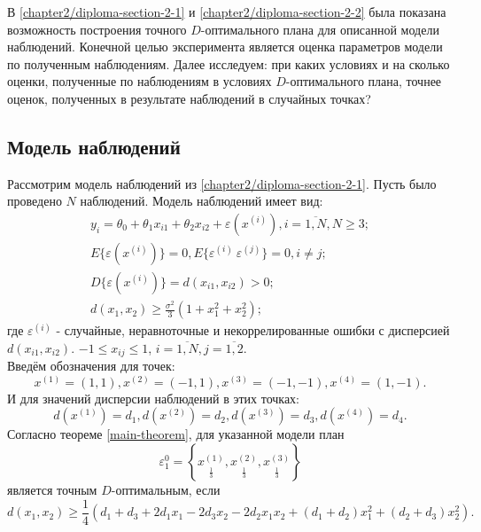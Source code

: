 В \ref{chapter2/diploma-section-2-1} и \ref{chapter2/diploma-section-2-2} была показана возможность построения точного $D$-оптимального плана для описанной модели наблюдений. Конечной целью эксперимента является оценка параметров модели по полученным наблюдениям. Далее исследуем: при каких условиях и на сколько оценки, полученные по наблюдениям в условиях $D$-оптимального плана, точнее оценок, полученных в результате наблюдений в случайных точках?

\subsection{Модель наблюдений}
Рассмотрим модель наблюдений из \ref{chapter2/diploma-section-2-1}.
Пусть было проведено $N$ наблюдений. Модель наблюдений имеет вид:
\begin{gather} \label{numerical-experiment:model:start}
y_i = \theta_0 + \theta_1 x_{i1} + \theta_2 x_{i2} + \varepsilon(x^{(i)}), i = \overline{1, N}, N \ge 3; \\
E\{ \varepsilon(x^{(i)}) \} = 0, E\{ \varepsilon^{(i)}\ \varepsilon^{(j)} \} = 0, i \ne j; \\
D\{ \varepsilon(x^{(i)}) \} = d(x_{i1}, x_{i2}) > 0; \\
d(x_1, x_2) \ge \frac{\sigma^2}{3}(1 + x_1^2 + x_2^2);
\label{numerical-experiment:model:end}
\end{gather}
где $\varepsilon^{(i)}$ - случайные, неравноточные и некоррелированные ошибки с дисперсией $d(x_{i1}, x_{i2})$. $-1 \le x_{ij} \le 1$, $i=\overline{1,N}, j=\overline{1, 2}$.\\
Введём обозначения для точек:
\begin{equation}\label{numerical-experiment:plan-points}
x^{(1)}=(1, 1), x^{(2)}=(-1, 1), x^{(3)}=(-1, -1), x^{(4)}=(1, -1).
\end{equation}
И для значений дисперсии наблюдений в этих точках:
\begin{equation}
d(x^{(1)}) = d_1, d(x^{(2)}) = d_2, d(x^{(3)}) = d_3, d(x^{(4)}) = d_4.
\end{equation}
Согласно теореме \ref{main-theorem}, для указанной модели план
\begin{equation} \label{numerical-expetiment:plan-1}
\varepsilon_1^{0} = \left \{ 
\underset{\frac 1 3} {x^{(1)}},
\underset{\frac 1 3} {x^{(2)}},
\underset{\frac 1 3} {x^{(3)}}
\right \}
\end{equation}
является точным $D$-оптимальным, если
\begin{equation}\label{numerical-experiment:d-eq}
d(x_1, x_2) \ge \frac 1 4 (d_1 + d_3 + 2 d_1 x_1 - 2 d_3 x_2 - 2d_2 x_1 x_2 + (d_1 + d_2)x_1^2 + (d_2 + d_3)x_2^2).
\end{equation}


